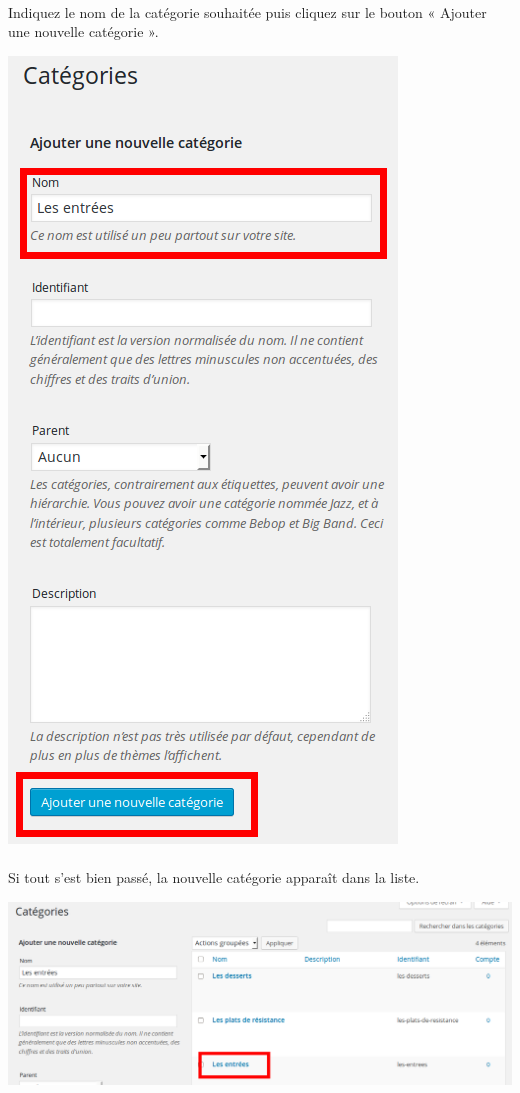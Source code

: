 \documentclass[10pt,a4paper]{article}
\begin{document}
\paragraph{}Indiquez le nom de la catégorie souhaitée puis cliquez sur le bouton « Ajouter une nouvelle catégorie ».
\begin{center}
\includegraphics[scale=0.3]{img/0090.png}
\end{center}
\paragraph{}Si tout s'est bien passé, la nouvelle catégorie apparaît dans la liste.
\begin{center}
\includegraphics[scale=0.3]{img/0091.png}
\end{center}
\end{document}
